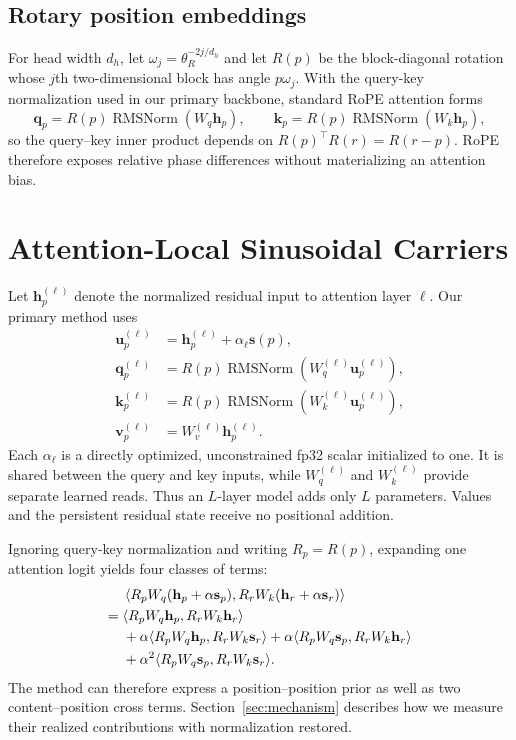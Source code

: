\documentclass{article}
\newcommand{\RMSNorm}{\operatorname{RMSNorm}}
\begin{document}
\subsection{Rotary position embeddings}

For head width $d_h$, let $\omega_j=\theta_R^{-2j/d_h}$ and let $R(p)$ be the
block-diagonal rotation whose $j$th two-dimensional block has angle
$p\omega_j$. With the query-key normalization used in our primary backbone,
standard RoPE attention forms
\begin{equation}
    \mathbf{q}_p=R(p)\RMSNorm(W_q\mathbf{h}_p),\qquad
    \mathbf{k}_p=R(p)\RMSNorm(W_k\mathbf{h}_p),
    \label{eq:rope}
\end{equation}
so the query--key inner product depends on $R(p)^\top R(r)=R(r-p)$.
RoPE therefore exposes relative phase differences without materializing an
attention bias.

\section{Attention-Local Sinusoidal Carriers}

Let $\mathbf{h}^{(\ell)}_p$ denote the normalized residual input to attention
layer $\ell$. Our primary method uses
\begin{align}
    \mathbf{u}^{(\ell)}_p
        &= \mathbf{h}^{(\ell)}_p + \alpha_\ell\mathbf{s}(p), \\
    \mathbf{q}^{(\ell)}_p
        &= R(p)\RMSNorm\!\left(W_q^{(\ell)}
             \mathbf{u}^{(\ell)}_p\right), \\
    \mathbf{k}^{(\ell)}_p
        &= R(p)\RMSNorm\!\left(W_k^{(\ell)}
             \mathbf{u}^{(\ell)}_p\right), \\
    \mathbf{v}^{(\ell)}_p
        &= W_v^{(\ell)}\mathbf{h}^{(\ell)}_p.
    \label{eq:method}
\end{align}
Each $\alpha_\ell$ is a directly optimized, unconstrained fp32 scalar
initialized to one. It is shared between the query and key inputs, while
$W_q^{(\ell)}$ and $W_k^{(\ell)}$ provide separate learned reads. Thus an
$L$-layer model adds only $L$ parameters. Values and the persistent residual
state receive no positional addition.

Ignoring query-key normalization and writing $R_p=R(p)$, expanding one
attention logit yields four classes of terms:
\begin{align}
  &\left\langle R_pW_q(\mathbf{h}_p+\alpha\mathbf{s}_p),
          R_rW_k(\mathbf{h}_r+\alpha\mathbf{s}_r)\right\rangle \notag\\
  ={}&\langle R_pW_q\mathbf{h}_p,R_rW_k\mathbf{h}_r\rangle \\
   &+\alpha\langle R_pW_q\mathbf{h}_p,R_rW_k\mathbf{s}_r\rangle
    +\alpha\langle R_pW_q\mathbf{s}_p,R_rW_k\mathbf{h}_r\rangle \notag\\
   &+\alpha^2\langle R_pW_q\mathbf{s}_p,R_rW_k\mathbf{s}_r\rangle.
    \label{eq:fourterms}
\end{align}
The method can therefore express a position--position prior as well as two
content--position cross terms. Section~\ref{sec:mechanism} describes how we
measure their realized contributions with normalization restored.
\end{document}
